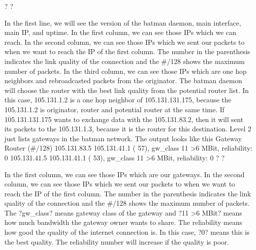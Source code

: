 \documentclass[
	12pt,
	a4paper,
	twoside,
	english,
	headsepline,
	footnosepline,
	automark,
	normalheadings,
	openany,
	cleardoubleplain,
	abstracton,
	idxtotoc,
	liststotoc,
	bibtotoc,
 	BCOR8mm,
]{scrartcl}
\begin{document}
? ?

In the first line, we will see the version of the batman daemon, main interface, main  IP, and uptime. In the first column, we can see those IPs  which we can reach. In the second column, we can see those IPs which we sent our packets to when we  want to reach the IP of the first column. The number in the parenthesis indicates the  link quality of the connection and the \#/128 shows the maximum number of packets. In the third column, we can see those IPs which are one hop neighbors and  rebroadcasted packets from the originator. The batman daemon will choose the router  with the best link quality from the potential router list.  In this case, 105.131.1.2 is a one hop neighbor of 105.131.131.175, because the 105.131.1.2  is  originator, router and potential router at the same time. If 105.131.131.175 wants to exchange  data with the 105.131.83.2, then it will sent its packets to the 105.131.1.3, because it is the  router for this destination. Level 2 just lists gateways in the batman network. The output looks like this Gateway              Router (\#/128)   105.131.83.5       105.131.41.1 ( 57), gw\_class 11   >6 MBit, reliability: 0   105.131.41.5       105.131.41.1 ( 53), gw\_class 11   >6 MBit, reliability: 0
? ?

In the first column, we can see those IPs  which are our gateways. In the second column, we can see those IPs which we sent our packets to when we  want to reach the IP of the first column. The number in the parenthesis indicates the  link quality of the connection and the \#/128 shows the maximum number of packets.  The ?gw\_class? means gateway class of the gateway and ?11  >6 MBit? means how  much bandwidth the gateway owner wants to share. The reliability means how good  the quality of the internet connection is. In this case, ?0? means this is the best  quality. The reliability number will increase if the quality is poor.
\end{document}
